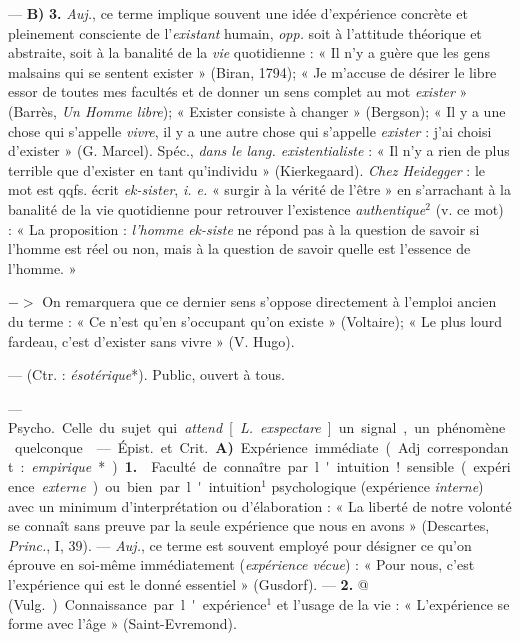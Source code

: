 \begin{itemize}[leftmargin=1cm, label=, itemsep=1pt]
— {\bf B)} {\bf 3.} {\it Auj.}, ce terme implique
souvent une idée d’expérience concrète et pleinement consciente de
l'{\it existant} humain, {\it opp.} soit à l’attitude théorique et
abstraite, soit à la banalité de la {\it vie} quotidienne :
« Il n’y a guère que les gens malsains
qui se sentent exister » (Biran,
1794); « Je m’accuse de désirer le
libre essor de toutes mes facultés et
de donner un sens complet au mot
{\it exister} » (Barrès, {\it Un Homme libre});
« Exister consiste à changer »
(Bergson); « Il y a une chose qui
s'appelle {\it vivre}, il y a une autre chose
qui s'appelle {\it exister} : j'ai choisi
d'exister » (G. Marcel). Spéc., {\it dans
le lang. existentialiste} : « Il n'y a
rien de plus terrible que d’exister
en tant qu'individu » (Kierkegaard).
{\it Chez Heidegger} : le mot est qqfs.
écrit {\it ek-sister}, {\it i. e.} « surgir à la vérité
de l'être » en s’arrachant à la banalité de la vie quotidienne pour
retrouver l'existence {\it authentique}$^2$ (v.
ce mot) : « La proposition : {\it l’homme
ek-siste} ne répond pas à la question
de savoir si l'homme est réel ou non,
mais à la question de savoir quelle
est l’essence de l’homme. »

$->$ On remarquera que ce dernier sens s'oppose directement à
l'emploi ancien du terme : « Ce n’est
qu'en s'occupant qu'on existe »
(Voltaire); « Le plus lourd fardeau,
c’est d'exister sans vivre » (V. Hugo).

 — (Ctr. : {\it ésotérique}*).
Public, ouvert à tous.

 — \si{Psycho.}
Celle du sujet qui {\it attend} [{\it L.} {\it exspectare}] un signal,
un phénomène quelconque.

 — \si{Épist.} et \si{Crit.} {\bf A)} \si{Expérience immédiate}. (Adj. correspondant : {\it empirique}*). {\bf 1.}  Faculté
de connaître par l'intuition! sensible (expérience {\it externe}) ou bien
par l'intuition$^1$ psychologique (expérience {\it interne}) avec un minimum
d'interprétation ou d'élaboration :
« La liberté de notre volonté se
connaît sans preuve par la seule
expérience que nous en avons »
(Descartes, {\it Princ.}, I, 39). —  {\it Auj.},
ce terme est souvent employé pour
désigner ce qu’on éprouve en soi-même immédiatement ({\it expérience
vécue}) : « Pour nous, c’est l’expérience qui est le donné essentiel »
(Gusdorf). — {\bf 2.} @ (\si{Vulg.}) Connaissance par l'expérience$^1$ et l'usage
de la vie : « L'expérience se forme
avec l’âge » (Saint-Evremond).


\end{itemize}
